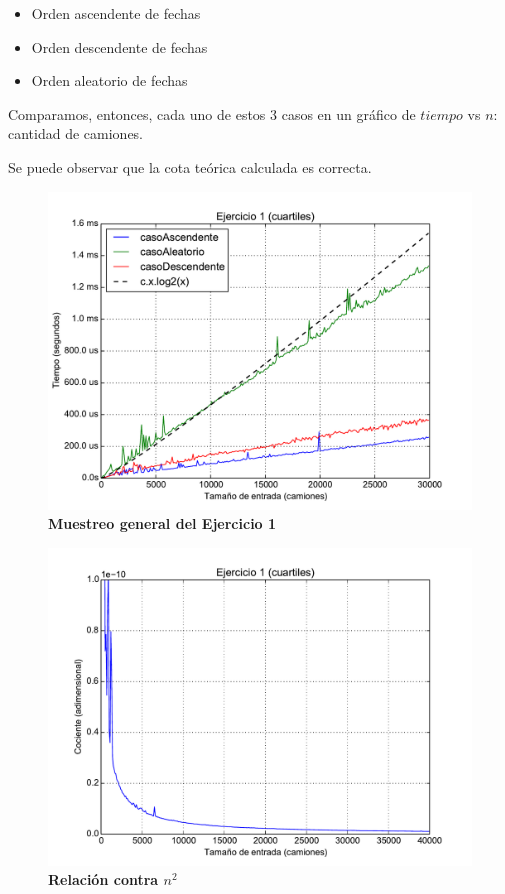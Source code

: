 \documentclass[11pt, a4paper, twoside]{article}
\begin{document}
\begin{itemize}
  \item Orden ascendente de fechas
  \item Orden descendente de fechas
  \item Orden aleatorio de fechas
\end{itemize}     

Comparamos, entonces, cada uno de estos $3$ casos en un gráfico de $tiempo$ vs $n$: cantidad de camiones. 

Se puede observar que la cota teórica calculada es correcta.

\clearpage
\begin{figure}[H]
   \begin{center}
   \includegraphics[width=1.4\textwidth,angle=90]{../ej1/graficos/test_1.pdf}
   \caption{\textbf{Muestreo general del Ejercicio 1}}
   \label{fig:ej1-1}
   \end{center}
\end{figure}

\begin{figure}[H]
   \begin{center}
   \includegraphics[width=1.4\textwidth,angle=90]{../ej1/graficos/test_2.pdf}
   \caption{\textbf{Relación contra $n^{2}$}}
   \label{fig:ej1-2}
   \end{center}
\end{figure}
\clearpage
\end{document}
